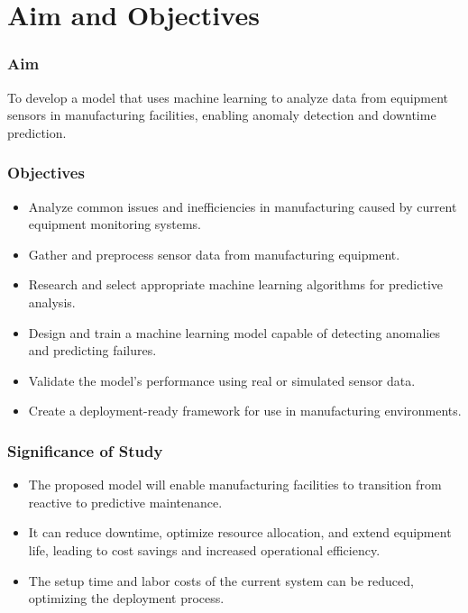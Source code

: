\chapter{Aim and Objectives}
\label{chap:aim}
\setlength{\parskip}{1em}

\subsection{Aim}
To develop a model that uses machine learning to analyze data from equipment
sensors in manufacturing facilities, enabling anomaly detection and downtime
prediction.

\subsection{Objectives}

\begin{itemize}
    \item Analyze common issues and inefficiencies in manufacturing caused by current equipment monitoring systems.
    \item Gather and preprocess sensor data from manufacturing equipment.
    \item Research and select appropriate machine learning algorithms for predictive analysis.
    \item Design and train a machine learning model capable of detecting anomalies and predicting failures.
    \item Validate the model’s performance using real or simulated sensor data.
    \item Create a deployment-ready framework for use in manufacturing environments.
\end{itemize}

\subsection{Significance of Study}
\begin{itemize}
    \item The proposed model will enable manufacturing facilities to transition from
reactive to predictive maintenance.
    \item It can reduce downtime, optimize resource allocation, and extend equipment
life, leading to cost savings and increased operational efficiency.
    \item The setup time and labor costs of the current system can be reduced, optimizing
the deployment process.
\end{itemize}